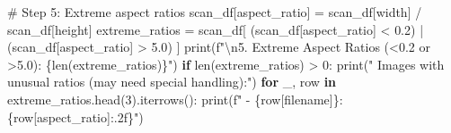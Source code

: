 \documentclass[
  letterpaper,
  DIV=11,
  numbers=noendperiod]{scrartcl}
\newenvironment{Shaded}{\begin{snugshade}}{\end{snugshade}}
\newcommand{\BuiltInTok}[1]{\textcolor[rgb]{0.00,0.23,0.31}{#1}}
\newcommand{\CharTok}[1]{\textcolor[rgb]{0.13,0.47,0.30}{#1}}
\newcommand{\CommentTok}[1]{\textcolor[rgb]{0.37,0.37,0.37}{#1}}
\newcommand{\ControlFlowTok}[1]{\textcolor[rgb]{0.00,0.23,0.31}{\textbf{#1}}}
\newcommand{\DecValTok}[1]{\textcolor[rgb]{0.68,0.00,0.00}{#1}}
\newcommand{\FloatTok}[1]{\textcolor[rgb]{0.68,0.00,0.00}{#1}}
\newcommand{\KeywordTok}[1]{\textcolor[rgb]{0.00,0.23,0.31}{\textbf{#1}}}
\newcommand{\NormalTok}[1]{\textcolor[rgb]{0.00,0.23,0.31}{#1}}
\newcommand{\OperatorTok}[1]{\textcolor[rgb]{0.37,0.37,0.37}{#1}}
\newcommand{\SpecialCharTok}[1]{\textcolor[rgb]{0.37,0.37,0.37}{#1}}
\newcommand{\SpecialStringTok}[1]{\textcolor[rgb]{0.13,0.47,0.30}{#1}}
\newcommand{\StringTok}[1]{\textcolor[rgb]{0.13,0.47,0.30}{#1}}
\renewenvironment{Shaded}{%
  \begin{tcolorbox}[%
    enhanced,%
    colback=codebg,%
    colframe=codebg,%
    borderline west={3pt}{0pt}{sectionblue},%
    boxrule=0pt,%
    arc=0pt,%
    boxsep=5pt,%
    left=2mm,%
    right=2mm,%
    top=2mm,%
    bottom=2mm%
  ]%
}{%
  \end{tcolorbox}%
}
\begin{document}
\begin{Shaded}
\begin{Highlighting}[]
\CommentTok{\# Step 5: Extreme aspect ratios}
\NormalTok{scan\_df[}\StringTok{\textquotesingle{}aspect\_ratio\textquotesingle{}}\NormalTok{] }\OperatorTok{=}\NormalTok{ scan\_df[}\StringTok{\textquotesingle{}width\textquotesingle{}}\NormalTok{] }\OperatorTok{/}\NormalTok{ scan\_df[}\StringTok{\textquotesingle{}height\textquotesingle{}}\NormalTok{]}
\NormalTok{extreme\_ratios }\OperatorTok{=}\NormalTok{ scan\_df[}
\NormalTok{    (scan\_df[}\StringTok{\textquotesingle{}aspect\_ratio\textquotesingle{}}\NormalTok{] }\OperatorTok{\textless{}} \FloatTok{0.2}\NormalTok{) }\OperatorTok{|} 
\NormalTok{    (scan\_df[}\StringTok{\textquotesingle{}aspect\_ratio\textquotesingle{}}\NormalTok{] }\OperatorTok{\textgreater{}} \FloatTok{5.0}\NormalTok{)}
\NormalTok{]}
\BuiltInTok{print}\NormalTok{(}\SpecialStringTok{f"}\CharTok{\textbackslash{}n}\SpecialStringTok{5. Extreme Aspect Ratios (\textless{}0.2 or \textgreater{}5.0): }\SpecialCharTok{\{}\BuiltInTok{len}\NormalTok{(extreme\_ratios)}\SpecialCharTok{\}}\SpecialStringTok{"}\NormalTok{)}
\ControlFlowTok{if} \BuiltInTok{len}\NormalTok{(extreme\_ratios) }\OperatorTok{\textgreater{}} \DecValTok{0}\NormalTok{:}
    \BuiltInTok{print}\NormalTok{(}\StringTok{"   Images with unusual ratios (may need special handling):"}\NormalTok{)}
    \ControlFlowTok{for}\NormalTok{ \_, row }\KeywordTok{in}\NormalTok{ extreme\_ratios.head(}\DecValTok{3}\NormalTok{).iterrows():}
        \BuiltInTok{print}\NormalTok{(}\SpecialStringTok{f"     {-} }\SpecialCharTok{\{}\NormalTok{row[}\StringTok{\textquotesingle{}filename\textquotesingle{}}\NormalTok{]}\SpecialCharTok{\}}\SpecialStringTok{: }\SpecialCharTok{\{}\NormalTok{row[}\StringTok{\textquotesingle{}aspect\_ratio\textquotesingle{}}\NormalTok{]}\SpecialCharTok{:.2f\}}\SpecialStringTok{"}\NormalTok{)}


\end{Highlighting}
\end{Shaded}
\end{document}
